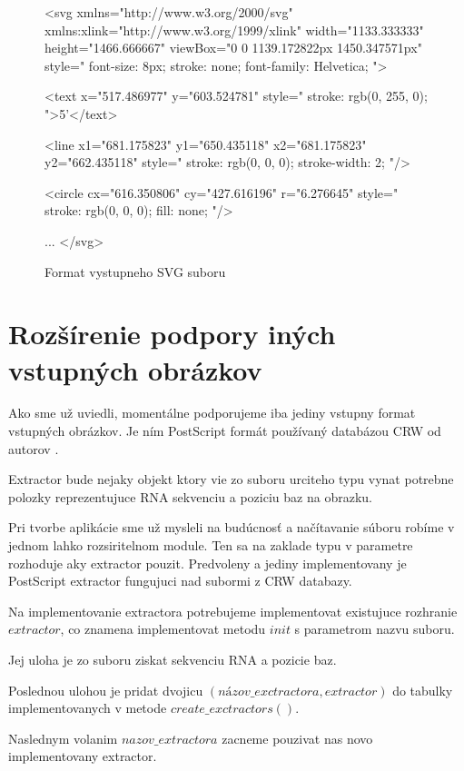 \begin{figure}
\begin{code}[fontsize=\scriptsize, frame=none, samepage=true]
<svg
  xmlns="http://www.w3.org/2000/svg"
  xmlns:xlink="http://www.w3.org/1999/xlink"
  width="1133.333333"
  height="1466.666667"
  viewBox="0 0 1139.172822px 1450.347571px"
  style="
    font-size: 8px; 
    stroke: none; 
    font-family: Helvetica; ">

  <text 
    x="517.486977"
    y="603.524781"
    style="
      stroke: rgb(0, 255, 0); ">5'</text>

  <line 
    x1="681.175823"
    y1="650.435118" 
    x2="681.175823"
    y2="662.435118"
    style="
      stroke: rgb(0, 0, 0); 
      stroke-width: 2; "/>


  <circle 
    cx="616.350806"
    cy="427.616196"
    r="6.276645"
    style="
      stroke: rgb(0, 0, 0); 
      fill: none; "/>

  ...
</svg>
\end{code}
\caption{Format vystupneho SVG suboru}
\label{obr:svg_out}
\end{figure}


\section{Rozšírenie podpory iných vstupných obrázkov}
\label{kap:rozsirenie}

Ako sme už uviedli, momentálne podporujeme iba jediny vstupny format vstupných obrázkov.
Je ním PostScript formát používaný databázou CRW od autorov \citet{CRW}.

\begin{definice}
  Extractor bude nejaky objekt ktory vie zo suboru urciteho typu vynat potrebne
  polozky reprezentujuce RNA sekvenciu a poziciu baz na obrazku.
\end{definice}

Pri tvorbe aplikácie sme už mysleli na budúcnosť a načítavanie súboru robíme v jednom lahko
rozsiritelnom module. Ten sa na zaklade typu v parametre  rozhoduje
aky extractor pouzit. Predvoleny a jediny implementovany je PostScript extractor fungujuci
nad subormi z CRW databazy.

Na implementovanie extractora potrebujeme implementovat existujuce rozhranie $extractor$,
co znamena implementovat metodu $init$ s parametrom nazvu suboru.

Jej uloha je zo suboru ziskat sekvenciu RNA a pozicie baz.

Poslednou ulohou je pridat dvojicu $(názov\_exctractora, extractor)$ do tabulky implementovanych
v metode $create\_exctractors()$.

Naslednym volanim   $nazov\_extractora$ zacneme
pouzivat nas novo implementovany extractor.


